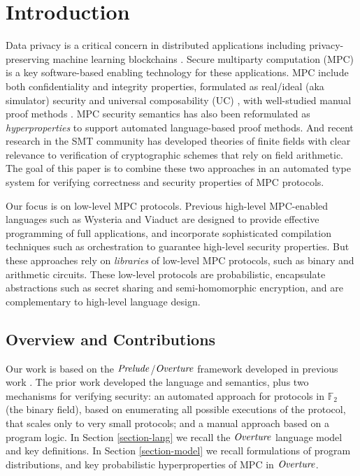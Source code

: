 \section{Introduction}

Data privacy is a critical concern in distributed applications
including privacy-preserving machine learning
\cite{li2021privacy,knott2021crypten,koch2020privacy,liu2020privacy}
blockchains
\cite{ishai2009zero,lu2019honeybadgermpc,gao2022symmeproof,tomaz2020preserving}.
Secure multiparty computation (MPC) is a key software-based enabling
technology for these applications. MPC include both confidentiality
and integrity properties, formulated as real/ideal (aka simulator)
security and universal composability (UC) \cite{evans2018pragmatic},
with well-studied manual proof methods \cite{Lindell2017}.  MPC
security semantics has also been reformulated as
\emph{hyperproperties}
\cite{8429300,10.1145/3453483.3454074,skalka-near-ppdp24} to support
automated language-based proof methods. And recent research in the SMT
community has developed theories of finite fields \cite{SMFF} with
clear relevance to verification of cryptographic schemes that rely on
field arithmetic. The goal of this paper is to combine these two
approaches in an automated type system for verifying correctness and
security properties of MPC protocols.

Our focus is on low-level MPC protocols. Previous high-level
MPC-enabled languages such as Wysteria \cite{rastogi2014wysteria} and
Viaduct \cite{10.1145/3453483.3454074} are designed to provide
effective programming of full applications, and incorporate
sophisticated compilation techniques such as orchestration
\cite{viaduct-UC} to guarantee high-level security properties. But
these approaches rely on \emph{libraries} of low-level MPC protocols,
such as binary and arithmetic circuits. These low-level protocols are
probabilistic, encapsulate abstractions such as secret sharing and
semi-homomorphic encryption, and are complementary to high-level
language design.

\subsection{Overview and Contributions}

Our work is based on the $\mathit{Prelude}$/$\mathit{Overture}$ framework developed in
previous work \cite{skalka-near-ppdp24}. The prior work developed the 
language and semantics, plus two mechanisms for verifying security: an
automated approach for protocols in $\mathbb{F}_2$ (the binary field),
based on enumerating all possible executions of the protocol, that scales 
only to very small protocols; and a manual approach based on a program logic.
%
In Section \ref{section-lang} we recall the $\mathit{Overture}$ language model and key definitions. In
Section \ref{section-model} we recall formulations of program distributions,
and key probabilistic hyperproperties of MPC in $\mathit{Overture}$. 

